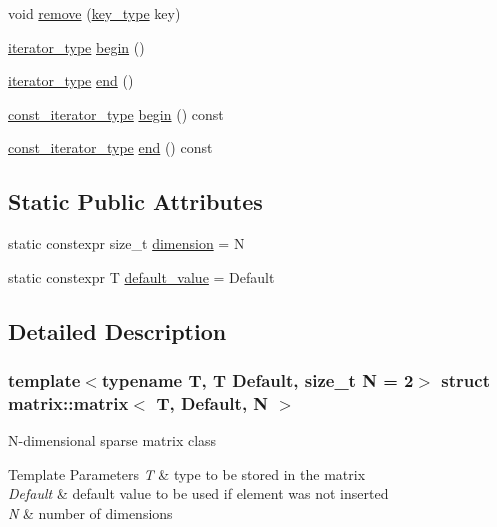 \begin{DoxyCompactItemize}
\item 
void \hyperlink{structmatrix_1_1matrix_ac15f926245fe20e9dfee3f0695299550}{remove} (\hyperlink{structmatrix_1_1matrix_af7b5498ac1b615cb9ef51bd185a2557e}{key\+\_\+type} key)
\item 
\hyperlink{structmatrix_1_1matrix_a82eef2feb50cdf62ced121fb74d3bc67}{iterator\+\_\+type} \hyperlink{structmatrix_1_1matrix_a1409af506e9c9fd589cf5d3f586fad4d}{begin} ()
\item 
\hyperlink{structmatrix_1_1matrix_a82eef2feb50cdf62ced121fb74d3bc67}{iterator\+\_\+type} \hyperlink{structmatrix_1_1matrix_a8a19b8753df3bc95f0955e85be430bb5}{end} ()
\item 
\hyperlink{structmatrix_1_1matrix_a22035dd29cc89014fbb33fd37bfeac93}{const\+\_\+iterator\+\_\+type} \hyperlink{structmatrix_1_1matrix_a864ff04f4b3590b5411746ab576c53e1}{begin} () const
\item 
\hyperlink{structmatrix_1_1matrix_a22035dd29cc89014fbb33fd37bfeac93}{const\+\_\+iterator\+\_\+type} \hyperlink{structmatrix_1_1matrix_ab1fae4edfc6c0cd8d0b0fa2c164bb0f4}{end} () const
\end{DoxyCompactItemize}
\subsection*{Static Public Attributes}
\begin{DoxyCompactItemize}
\item 
static constexpr size\+\_\+t \hyperlink{structmatrix_1_1matrix_a7d76bd51fd998974f59ea4035e053f74}{dimension} = N
\item 
static constexpr T \hyperlink{structmatrix_1_1matrix_a4c0193b1fdd949b71f717232cd2c7ce1}{default\+\_\+value} = Default
\end{DoxyCompactItemize}


\subsection{Detailed Description}
\subsubsection*{template$<$typename T, T Default, size\+\_\+t N = 2$>$\newline
struct matrix\+::matrix$<$ T, Default, N $>$}

N-\/dimensional sparse matrix class 
\begin{DoxyTemplParams}{Template Parameters}
{\em T} & type to be stored in the matrix \\
\hline
{\em Default} & default value to be used if element was not inserted \\
\hline
{\em N} & number of dimensions \\
\hline
\end{DoxyTemplParams}


